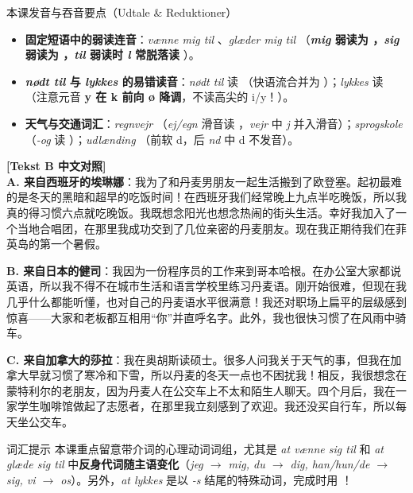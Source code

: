 \begin{tipbox}{本课发音与吞音要点（Udtale \& Reduktioner）}
\begin{itemize}
  \item \textbf{固定短语中的弱读连音}：\textit{vænne mig til} 、\textit{glæder mig til} （\textbf{\textit{mig} 弱读为 ，\textit{sig} 弱读为 ，\textit{til} 弱读时 \textit{l} 常脱落读 }）。
  \item \textbf{\textit{nødt til} 与 \textit{lykkes} 的易错读音}：\textit{nødt til} 读 （快语流合并为 ）；\textit{lykkes} 读 （注意元音 \textbf{y 在 k 前向 ø 降调}，不读高尖的 i/y！）。
  \item \textbf{天气与交通词汇}：\textit{regnvejr} （\textit{ej/egn} 滑音读 ，\textit{vejr} 中 \textit{j} 并入滑音）；\textit{sprogskole} （\textit{-og} 读 ）；\textit{udlænding} （前软 d，后 \textit{nd} 中 d 不发音）。
\end{itemize}
\end{tipbox}

\begin{transbox}
\small
\textbf{\color{NCDTeal}[Tekst B 中文对照]}\\
\textbf{A. 来自西班牙的埃琳娜}：我为了和丹麦男朋友一起生活搬到了欧登塞。起初最难的是冬天的黑暗和超早的吃饭时间！在西班牙我们经常晚上九点半吃晚饭，所以我真的得习惯六点就吃晚饭。我既想念阳光也想念热闹的街头生活。幸好我加入了一个当地合唱团，在那里我成功交到了几位亲密的丹麦朋友。现在我正期待我们在菲英岛的第一个暑假。

\textbf{B. 来自日本的健司}：我因为一份程序员的工作来到哥本哈根。在办公室大家都说英语，所以我不得不在城市生活和语言学校里练习丹麦语。刚开始很难，但现在我几乎什么都能听懂，也对自己的丹麦语水平很满意！我还对职场上扁平的层级感到惊喜——大家和老板都互相用“你”并直呼名字。此外，我也很快习惯了在风雨中骑车。

\textbf{C. 来自加拿大的莎拉}：我在奥胡斯读硕士。很多人问我关于天气的事，但我在加拿大早就习惯了寒冷和下雪，所以丹麦的冬天一点也不困扰我！相反，我很想念在蒙特利尔的老朋友，因为丹麦人在公交车上不太和陌生人聊天。四个月后，我在一家学生咖啡馆做起了志愿者，在那里我立刻感到了欢迎。我还没买自行车，所以每天坐公交车。
\end{transbox}


\begin{tipbox}{词汇提示}
本课重点留意带介词的心理动词词组，尤其是 \textit{at vænne sig til} 和 \textit{at glæde sig til} 中\textbf{反身代词随主语变化}（\textit{jeg $\rightarrow$ mig, du $\rightarrow$ dig, han/hun/de $\rightarrow$ sig, vi $\rightarrow$ os}）。另外，\textit{at lykkes} 是以 \textit{-s} 结尾的特殊动词，完成时用 ！
\end{tipbox}

